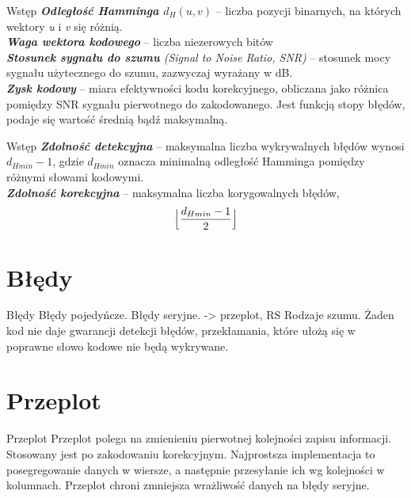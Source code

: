 \documentclass[12pt]{beamer}
\begin{document}
\begin{frame}{Wstęp}
	\emph{\textbf{Odległość Hamminga $d_H(u, v)$}} -- liczba pozycji binarnych, na których wektory \emph{u} i \emph{v} się różnią.\\
	\emph{\textbf{Waga wektora kodowego}} -- liczba niezerowych bitów\\

	\emph{\textbf{Stosunek sygnału do szumu} (Signal to Noise Ratio, SNR)} -- stosunek mocy sygnału użytecznego do szumu, zazwyczaj wyrażany w dB.\\
	\emph{\textbf{Zysk kodowy}} -- miara efektywności kodu korekcyjnego, obliczana jako różnica pomiędzy SNR sygnału pierwotnego do zakodowanego. Jest funkcją stopy błędów, podaje się wartość średnią bądź maksymalną.
\end{frame}

\begin{frame}{Wstęp}
	\emph{\textbf{Zdolność detekcyjna}} -- maksymalna liczba wykrywalnych błędów wynosi $d_{Hmin}-1$, gdzie \emph{$d_{Hmin}$} oznacza minimalną odległość Hamminga pomiędzy różnymi słowami kodowymi.\\
	\emph{\textbf{Zdolność korekcyjna}} -- maksymalna liczba korygowalnych błędów, 
	\begin{equation}
\Bigl\lfloor \frac{d_{Hmin}-1}{2} \Bigr\rfloor	
\end{equation}	

	
\end{frame}

\section{Błędy}
\begin{frame}{Błędy}
Błędy pojedyńcze.
Błędy seryjne. -> przeplot, RS
Rodzaje szumu.
Żaden kod nie daje gwarancji detekcji błędów, przekłamania, które ułożą się w poprawne słowo kodowe nie będą wykrywane.
\end{frame}

\section{Przeplot}
\begin{frame}{Przeplot}
Przeplot polega na zmienieniu pierwotnej kolejności zapisu informacji. Stosowany jest po zakodowaniu korekcyjnym. Najprostsza implementacja to posegregowanie danych w wiersze, a następnie przesyłanie ich wg kolejności w kolumnach. Przeplot chroni zmniejsza wrażliwość danych na błędy seryjne.
\end{frame}
\end{document}
